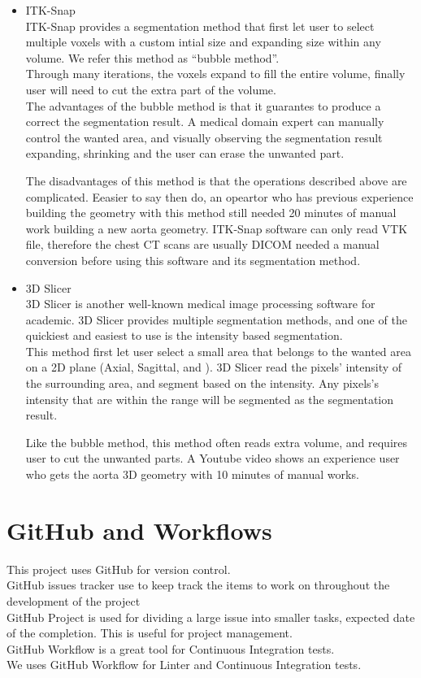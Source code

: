 \begin{itemize}
\item ITK-Snap\\
ITK-Snap provides a segmentation method that first let user to select multiple voxels with a custom intial size and expanding size within any volume. We refer this method as ``bubble method''.\\
Through many iterations, the voxels expand to fill the entire volume, finally user will need to cut the extra part of the volume. \\
The advantages of the bubble method is that it guarantes to produce a correct the segmentation result. A medical domain expert can manually control the wanted area, and visually observing the segmentation result expanding, shrinking and the user can erase the unwanted part.

The disadvantages of this method is that the operations described above are complicated. Eeasier to say then do, an opeartor who has previous experience building the geometry with this method still needed 20 minutes of manual work building a new aorta geometry. ITK-Snap software can only read VTK file, therefore the chest CT scans are usually DICOM needed a manual conversion before using this software and its segmentation method.

\item 3D Slicer\\
3D Slicer is another well-known medical image processing software for academic. 3D Slicer provides multiple segmentation methods, and one of the quickiest and easiest to use is the intensity based segmentation.\\

This method first let user select a small area that belongs to the wanted area on a 2D plane (Axial, Sagittal, and ). 3D Slicer read the pixels' intensity of the surrounding area, and segment based on the intensity. Any pixels's intensity that are within the range will be segmented as the segmentation result. 

Like the bubble method, this method often reads extra volume, and requires user to cut the unwanted parts. A Youtube video shows an experience user who gets the aorta 3D geometry with 10 minutes of manual works.
\end{itemize}


\section{GitHub and Workflows}
This project uses GitHub for version control. \\
GitHub issues tracker use to keep track the items to work on throughout the development of the project\\
GitHub Project is used for dividing a large issue into smaller tasks, expected date of the completion. This is useful for project management.\\
GitHub Workflow is a great tool for Continuous Integration tests. \\
We uses GitHub Workflow for Linter and Continuous Integration tests. \\

